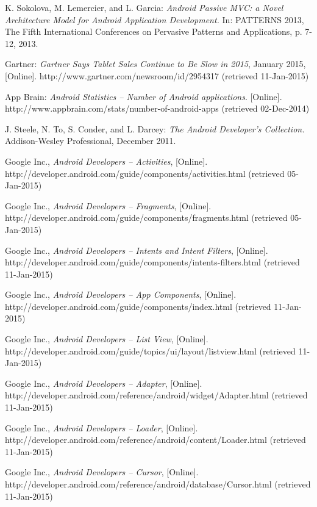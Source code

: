 \begin{thebibliography}{1}

K. Sokolova, M. Lemercier, and L. Garcia: \emph{Android Passive MVC: a Novel Architecture Model for Android Application Development.} In: PATTERNS 2013, The Fifth International Conferences on Pervasive Patterns and Applications, p. 7-12, 2013.

Gartner: \emph{Gartner Says Tablet Sales Continue to Be Slow in 2015}, January 2015, 
[Online]. http://www.gartner.com/newsroom/id/2954317 (retrieved 11-Jan-2015)

App Brain: \emph{Android Statistics -- Number of Android applications}. 
[Online]. http://www.appbrain.com/stats/number-of-android-apps (retrieved 02-Dec-2014)

J. Steele, N. To, S. Conder, and L. Darcey: \emph{The Android Developer's Collection.} Addison-Wesley Professional, December 2011.

Google Inc., \emph{Android Developers -- Activities},
[Online]. http://developer.android.com/guide/components/activities.html (retrieved 05-Jan-2015)

Google Inc., \emph{Android Developers -- Fragments},
[Online]. http://developer.android.com/guide/components/fragments.html (retrieved 05-Jan-2015)

Google Inc., \emph{Android Developers -- Intents and Intent Filters},
[Online]. http://developer.android.com/guide/components/intents-filters.html (retrieved 11-Jan-2015)

Google Inc., \emph{Android Developers -- App Components},
[Online]. http://developer.android.com/guide/components/index.html (retrieved 11-Jan-2015)

Google Inc., \emph{Android Developers -- List View},
[Online]. http://developer.android.com/guide/topics/ui/layout/listview.html (retrieved 11-Jan-2015)

Google Inc., \emph{Android Developers -- Adapter},
[Online]. http://developer.android.com/reference/android/widget/Adapter.html (retrieved 11-Jan-2015)

Google Inc., \emph{Android Developers -- Loader},
[Online]. http://developer.android.com/reference/android/content/Loader.html (retrieved 11-Jan-2015)

Google Inc., \emph{Android Developers -- Cursor},
[Online]. http://developer.android.com/reference/android/database/Cursor.html (retrieved 11-Jan-2015)


\end{thebibliography}
